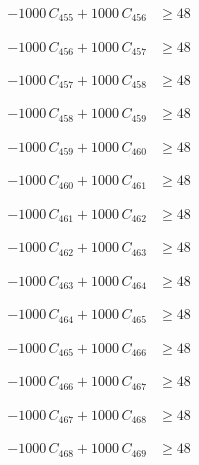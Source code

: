 \documentclass[a4paper,11pt]{article}
\begin{document}
\begin{align}
-1000\,C_{455} + 1000\,C_{456} &\geq 48 \nonumber
\end{align}

\begin{align}
-1000\,C_{456} + 1000\,C_{457} &\geq 48 \nonumber
\end{align}

\begin{align}
-1000\,C_{457} + 1000\,C_{458} &\geq 48 \nonumber
\end{align}

\begin{align}
-1000\,C_{458} + 1000\,C_{459} &\geq 48 \nonumber
\end{align}

\begin{align}
-1000\,C_{459} + 1000\,C_{460} &\geq 48 \nonumber
\end{align}

\begin{align}
-1000\,C_{460} + 1000\,C_{461} &\geq 48 \nonumber
\end{align}

\begin{align}
-1000\,C_{461} + 1000\,C_{462} &\geq 48 \nonumber
\end{align}

\begin{align}
-1000\,C_{462} + 1000\,C_{463} &\geq 48 \nonumber
\end{align}

\begin{align}
-1000\,C_{463} + 1000\,C_{464} &\geq 48 \nonumber
\end{align}

\begin{align}
-1000\,C_{464} + 1000\,C_{465} &\geq 48 \nonumber
\end{align}

\begin{align}
-1000\,C_{465} + 1000\,C_{466} &\geq 48 \nonumber
\end{align}

\begin{align}
-1000\,C_{466} + 1000\,C_{467} &\geq 48 \nonumber
\end{align}

\begin{align}
-1000\,C_{467} + 1000\,C_{468} &\geq 48 \nonumber
\end{align}

\begin{align}
-1000\,C_{468} + 1000\,C_{469} &\geq 48 \nonumber
\end{align}
\end{document}
